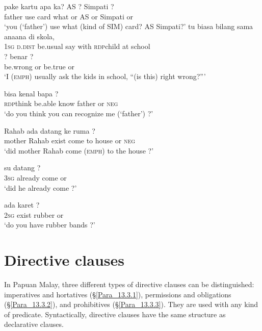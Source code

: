 \ea
\label{Example_13.36}
 {pake} {kartu} {apa} {ka?} {AS} {?} {Simpati} {?}\\ %
 father  use  card  what  or  AS  or  Simpati  or\\
\glt 
‘you (‘father’) use what (kind of SIM) card? AS  Simpati?’ \textstyleExampleSource{[081014-016-Cv.0012]}
\z
\ea
\label{Example_13.37}
 {{tu}} {{biasa}} {{bilang}} {sama} {ana{\Tilde}ana} {di} {skola,}\\ %
 \textsc{1sg}  {\textsc{d.dist}}  {be.usual}  {say}  with  \textsc{rdp}{\Tilde}child  at  school\\
  {?}  {benar}  {?}\\
 {be.wrong}  {or}  {be.true}  {or}\\
\glt 
‘I (\textsc{emph}) usually ask the kids in school, ``(is this) right  wrong?''' \textstyleExampleSource{[081014-015-Cv.0029]}
\z

\ea
\label{Example_13.38}
 {bisa} {kenal} {bapa} {} {?}\\ %
 \textsc{rdp}{\Tilde}think  be.able  know  father  or  \textsc{neg}\\
\glt 
‘do you think you can recognize me (‘father’) ?’ \textstyleExampleSource{[080922-001a-CvPh.1301]}
\z

\ea
\label{Example_13.39}
 {Rahab} {ada} {datang} {ke} {ruma} {} {?}\\ %
 mother  Rahab  exist  come  to  house  or  \textsc{neg}\\
\glt 
‘did mother Rahab come (\textsc{emph}) to the house ?’ \textstyleExampleSource{[081110-003-Cv.0001]}
\z

\ea
\label{Example_13.40}
 {su} {datang} {?}\\ %
 \textsc{3sg}  already  come  or\\
\glt 
‘did he already come ?’ \textstyleExampleSource{[080925-003-Cv.0138]}
\z

\ea
\label{Example_13.41}
 {ada} {karet} {?}\\ %
 \textsc{2sg}  exist  rubber  or\\
\glt
‘do you have rubber bands ?’ \textstyleExampleSource{[081110-004-Cv.0008]}
\z

\section{Directive clauses}
\label{Para_13.3}
In Papuan Malay, three different types of directive clauses can be distinguished: imperatives and hortatives (§\ref{Para_13.3.1}), permissions and obligations (§\ref{Para_13.3.2}), and prohibitives (§\ref{Para_13.3.3}). They are used with any kind of predicate. Syntactically, directive clauses have the same structure as declarative clauses.


